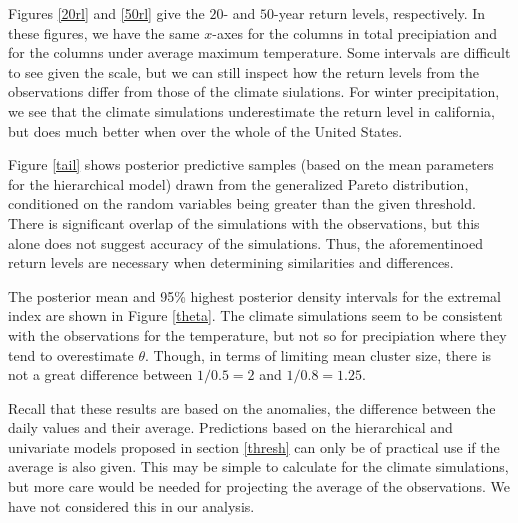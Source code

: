 \documentclass[12pt]{article}
\begin{document}
Figures \ref{20rl} and \ref{50rl} give the $20$- and $50$-year return levels, respectively. In these figures, we have the same $x$-axes for the columns in total precipiation and for the columns under average maximum temperature. Some intervals are difficult to see given the scale, but we can still inspect how the return levels from the observations differ from those of the climate siulations. For winter precipitation, we see that the climate simulations underestimate the return level in california, but does much better when over the whole of the United States.

Figure \ref{tail} shows posterior predictive samples (based on the mean parameters for the hierarchical model) drawn from the generalized Pareto distribution, conditioned on the random variables being greater than the given threshold. There is significant overlap of the simulations with the observations, but this alone does not suggest accuracy of the simulations. Thus, the aforementinoed return levels are necessary when determining similarities and differences.

The posterior mean and 95\% highest posterior density intervals for the extremal index are shown in Figure \ref{theta}. The climate simulations seem to be consistent with the observations for the temperature, but not so for precipiation where they tend to overestimate $\theta$. Though, in terms of limiting mean cluster size, there is not a great difference between $1/0.5=2$ and $1/0.8=1.25$.

Recall that these results are based on the anomalies, the difference between the daily values and their average. Predictions based on the hierarchical and univariate models proposed in section \ref{thresh} can only be of practical use if the average is also given. This may be simple to calculate for the climate simulations, but more care would be needed for projecting the average of the observations. We have not considered this in our analysis.
\end{document}
